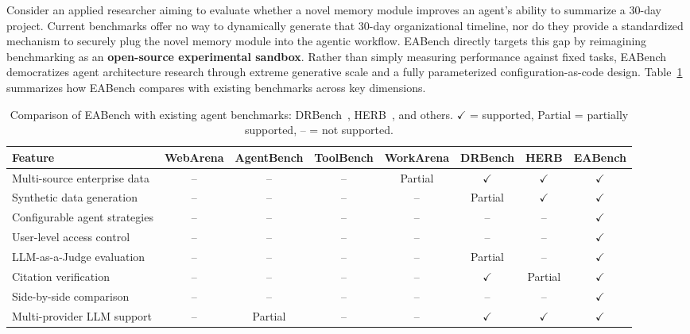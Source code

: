 \documentclass[journal,dvipsnames]{acmart}
\begin{document}
Consider an applied researcher aiming to evaluate whether a novel memory module improves an agent's ability to summarize a 30-day project. Current benchmarks offer no way to dynamically generate that 30-day organizational timeline, nor do they provide a standardized mechanism to securely plug the novel memory module into the agentic workflow. EABench directly targets this gap by reimagining benchmarking as an \textbf{open-source experimental sandbox}. Rather than simply measuring performance against fixed tasks, EABench democratizes agent architecture research through extreme generative scale and a fully parameterized configuration-as-code design. Table~\ref{tab:comparison} summarizes how EABench compares with existing
benchmarks across key dimensions.

\begin{table}[t]
\centering
\caption{Comparison of EABench with existing agent benchmarks: DRBench~\cite{abaskohi2025drbench}, HERB~\cite{choubey2025benchmarking}, and others. $\checkmark$ = supported, Partial = partially supported, -- = not supported.}
\label{tab:comparison}
\small
\begin{tabular}{lcccccc c}
\toprule
\textbf{Feature} & \textbf{WebArena} & \textbf{AgentBench} & \textbf{ToolBench} & \textbf{WorkArena} & \textbf{DRBench} & \textbf{HERB} & \textbf{EABench} \\
\midrule
Multi-source enterprise data          & --            & --             & --             & Partial        & $\checkmark$   & $\checkmark$   & $\checkmark$ \\
Synthetic data generation             & --            & --             & --             & --             & Partial        & $\checkmark$   & $\checkmark$ \\
Configurable agent strategies         & --            & --             & --             & --             & --             & --             & $\checkmark$ \\
User-level access control             & --            & --             & --             & --             & --             & --             & $\checkmark$ \\
LLM-as-a-Judge evaluation             & --            & --             & --             & --             & Partial        & --             & $\checkmark$ \\
Citation verification       & --            & --             & --             & --             & $\checkmark$   & Partial        & $\checkmark$ \\
Side-by-side comparison               & --            & --             & --             & --             & --             & --             & $\checkmark$ \\
Multi-provider LLM support            & --            & Partial        & --             & --             & $\checkmark$   & $\checkmark$   & $\checkmark$ \\
\bottomrule
\end{tabular}
\end{table}
\end{document}
